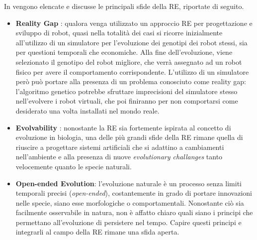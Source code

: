 \documentclass[a4paper,12pt]{article}
\begin{document}
In \cite{ERWWW} vengono elencate e discusse le principali sfide della RE, riportate di seguito.
\begin{itemize}
	\item \textbf{Reality Gap} : qualora venga utilizzato un approccio RE per progettazione e sviluppo di robot, quasi nella totalità dei casi
	si ricorre inizialmente all'utilizzo di un simulatore per l'evoluzione dei genotipi dei robot stessi, sia per questioni temporali che economiche. Alla fine dell'evoluzione, viene selezionato il genotipo del robot migliore, che verrà assegnato ad un robot fisico per avere il comportamento corrispondente. L'utilizzo di un simulatore però può portare alla presenza di un problema conosciuto come reality gap: l'algoritmo genetico potrebbe sfruttare imprecisioni del simulatore stesso nell'evolvere i robot virtuali, che poi finiranno per non comportarsi come desiderato una volta installati nel mondo reale.
	\item \textbf{Evolvability} : nonostante la RE sia fortemente ispirata al concetto di evoluzione in biologia, una delle più grandi sfide della RE rimane quella di riuscire a progettare sistemi artificiali che si adattino a cambiamenti nell'ambiente e alla presenza di nuove \emph{evolutionary challanges} tanto velocemente quanto le specie naturali.
	\item \textbf{Open-ended Evolution}: l'evoluzione naturale è un processo senza limiti temporali precisi (\emph{open-ended}), costantemente in grado di portare innovazioni nelle specie, siano esse morfologiche o comportamentali. Nonostante ciò sia facilmente osservabile in natura, non è affatto chiaro quali siano i principi che permettano all'evoluzione di persistere nel tempo. Capire questi principi e integrarli al campo della RE rimane una sfida aperta.
\end{itemize}
\end{document}

